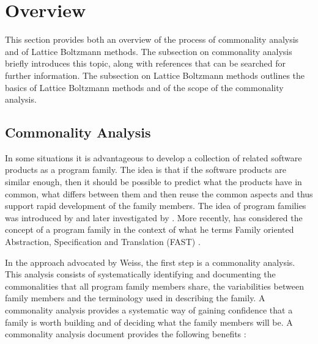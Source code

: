 \documentclass[12pt]{article}
\begin{document}
\newpage
\section{Overview}
This section provides both an overview of the process of commonality analysis and of Lattice Boltzmann methods. The subsection on commonality analysis briefly introduces this topic, along with references that can be searched for further information. The subsection on Lattice Boltzmann methods outlines the basics of Lattice Boltzmann methods and of the scope of the commonality analysis.

\subsection{Commonality Analysis}
In some situations it is advantageous to develop a collection of related software products as a program family. The idea is that if the software products are similar enough, then it should be possible to predict what the products have in common, what differs between them and then reuse the common aspects and thus support rapid development of the family members. The idea of program families was introduced by \cite{dijkstra1972} and later investigated by \cite{parnas1976design,parnas1979designing}. More recently, \cite{weiss1997defining, weiss1998commonality, ardis1997defining} has considered the concept of a program family in the context of what he terms Family oriented Abstraction, Specification and Translation (FAST) \citep{cuka1997specifying,weiss1999software}.

In the approach advocated by Weiss, the first step is a commonality analysis. This analysis consists of systematically identifying and documenting the commonalities that all program family members share, the variabilities between family members and the terminology used in describing the family. A commonality analysis provides a systematic way of gaining confidence that a family is worth building and of deciding what the family members will be. A commonality analysis document provides the following benefits \cite{weiss1997defining, weiss1998commonality}:
\end{document}
